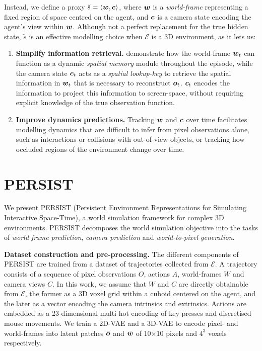 \documentclass{article}
\theoremstyle{plain}
\theoremstyle{definition}
\theoremstyle{remark}
\begin{document}
Instead, we define a proxy $\tilde{s} = \langle {\bm{w}}, {\bm{c}} \rangle$, where ${\bm{w}}$ is a \textit{world-frame} representing a fixed region of space centred on the agent, and ${\bm{c}}$ is a camera state encoding the agent's view within ${\bm{w}}$.
Although not a perfect replacement for the true hidden state, $\tilde{s}$ is an effective modelling choice when $\mathcal{E}$ is a 3D environment, as it lets us:
\begin{enumerate}
    \item \textbf{Simplify information retrieval.}  demonstrate how the world-frame ${\bm{w}}_t$ can function as a dynamic \textit{spatial memory} module throughout the episode, while the camera state ${\bm{c}}_t$ acts as a \textit{spatial lookup-key } to retrieve the spatial information in ${\bm{w}}_t$ that is necessary to reconstruct ${\bm{o}}_t$. ${\bm{c}}_t$ encodes the information to project this information to screen-space, without requiring explicit knowledge of the true observation function.
    \item \textbf{Improve dynamics predictions.} Tracking ${\bm{w}}$ and ${\bm{c}}$ over time facilitates modelling dynamics that are difficult to infer from pixel observations alone, such as interactions or collisions with out-of-view objects, or tracking how occluded regions of the environment change over time.
\end{enumerate}




\section{PERSIST}
We present PERSIST (Persistent Environment Representations for Simulating Interactive Space-Time), a world simulation framework for complex 3D environments.
PERSIST decomposes the world simulation objective into the tasks of \textit{world frame prediction}, \textit{camera prediction} and \textit{world-to-pixel generation}.

\textbf{Dataset construction and pre-processing.} The different components of PERSIST are trained from a dataset of trajectories collected from $\mathcal{E}$.
A trajectory consists of a sequence of pixel observations $O$, actions $A$, world-frames $W$ and camera views $C$.
In this work, we assume that $W$ and $C$ are directly obtainable from $\mathcal{E}$, the former as a 3D voxel grid within a cuboid centered on the agent, and the later as a vector encoding the camera intrinsics and extrinsics.
Actions are embedded as a 23-dimensional multi-hot encoding of key presses and discretised mouse movements.
We train a 2D-VAE and a 3D-VAE to encode pixel- and world-frames into latent patches $\bar{{\bm{o}}}$ and $\bar{{\bm{w}}}$ of 10$\times$10 pixels and $4^3$ voxels respectively. 
\end{document}

